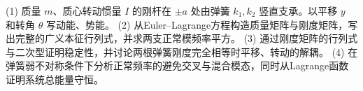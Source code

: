 (1) 质量 \(m\)、质心转动惯量 \(I\) 的刚杆在 \(\pm a\) 处由弹簧 \(k_1,k_2\) 竖直支承。以平移 \(y\) 和转角 \(\theta\) 写动能、势能。
(2) 从Euler–Lagrange方程构造质量矩阵与刚度矩阵，写出完整的广义本征行列式，并求两支正常模频率平方。
(3) 通过刚度矩阵的行列式与二次型证明稳定性，并讨论两根弹簧刚度完全相等时平移、转动的解耦。
(4) 在弹簧弱不对称条件下分析正常频率的避免交叉与混合模态，同时从Lagrange函数证明系统总能量守恒。
